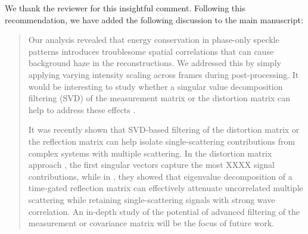 \documentclass[12pt]{article}
\newcommand{\hlred}[1]{\sethlcolor{red!30}\hl{#1}}
\newenvironment{ourresponse}
    {\begin{tcolorbox}[width=\linewidth,breakable,enhanced,colback=gray!5,colframe=responsecolor!50,title=Response,left=5pt,right=5pt]}
    {\end{tcolorbox}}
\begin{document}
\begin{ourresponse}

    

    We thank the reviewer for this insightful comment. Following this recommendation, we have added the following discussion to the main manuscript:
    
    \begin{quote}
        Our analysis revealed that energy conservation in phase-only speckle patterns introduces troublesome spatial correlations that can cause background haze in the reconstructions. We addressed this by simply applying varying intensity scaling across frames during post-processing. It would be interesting to study whether a singular value decomposition filtering (SVD) of the measurement matrix or the distortion matrix \cite{badon2020distortion,jo2022through} can help to address these effects .
        

        It was recently shown that SVD-based filtering of the distortion matrix \cite{badon2020distortion} or the reflection matrix \cite{jo2022through} can help isolate single-scattering contributions from complex systems with multiple scattering. In the distortion matrix approach \cite{badon2020distortion}, the first singular vectors capture the most XXXX signal contributions, while in \cite{jo2022through}, they showed that eigenvalue decomposition of a time-gated reflection matrix can effectively attenuate uncorrelated multiple scattering while retaining single-scattering signals with strong wave correlation. An in-depth study of the potential of advanced filtering of the measurement or covariance matrix will be the focus of future work.


\end{quote}
\end{ourresponse}
\end{document}
